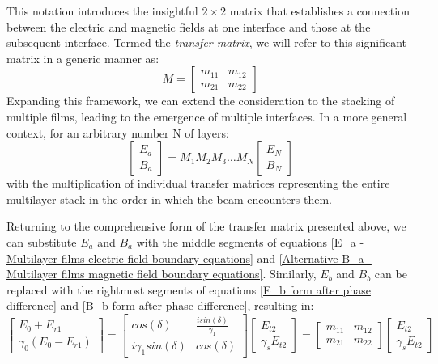 This notation introduces the insightful $2 \times 2$ matrix that establishes a connection between the electric and magnetic fields at one interface and those at the subsequent interface. Termed the \emph{transfer matrix}, we will refer to this significant matrix in a generic manner as: %
    \[
    M=
      \begin{bmatrix}
        m_{11} & m_{12}  \\
        m_{21} & m_{22}
      \end{bmatrix}
    \]
Expanding this framework, we can extend the consideration to the stacking of multiple films, leading to the emergence of multiple interfaces. In a more general context, for an arbitrary number N of layers: %
    \[
      \begin{bmatrix}
        E_a  \\
        B_a
      \end{bmatrix} = 
            M_1M_2M_3\hdots M_N
            \begin{bmatrix}
            E_N \\
            B_N
          \end{bmatrix}
    \]
with the multiplication of individual transfer matrices representing the entire multilayer stack in the order in which the beam encounters them.

Returning to the comprehensive form of the transfer matrix presented above, we can substitute $E_a$ and $B_a$ with the middle segments of equations \ref{E_a - Multilayer films electric field boundary equations} and \ref{Alternative B_a - Multilayer films magnetic field boundary equations}. Similarly, $E_b$ and $B_b$ can be replaced with the rightmost segments of equations \ref{E_b form after phase difference} and \ref{B_b form after phase difference}, resulting in: %
    \[
      \begin{bmatrix}
        E_0 + E_{r1}  \\
        \gamma_0(E_0 - E_{r1})
      \end{bmatrix} = 
            \begin{bmatrix}
            cos(\delta) & \frac{isin(\delta)}{\gamma_1} \\
            i\gamma_1sin(\delta) & cos(\delta)
            \end{bmatrix}
            \begin{bmatrix}
            E_{t2}  \\
            \gamma_sE_{t2}
          \end{bmatrix} =
                \begin{bmatrix}
                    m_{11} & m_{12} \\
                    m_{21} & m_{22}
                \end{bmatrix}
                \begin{bmatrix}
                    E_{t2} \\
                    \gamma_sE_{t2}
                  \end{bmatrix}
    \]

